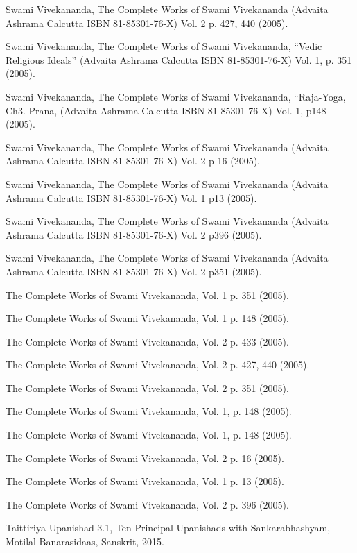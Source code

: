 \documentclass[twoside, 13pt]{article}
\begin{document}
{{{\begin{thebibliography}{99}
\bibitem{} Swami Vivekananda, The Complete Works of Swami Vivekananda (Advaita Ashrama Calcutta ISBN 81-85301-76-X) Vol. 2 p. 427, 440 (2005).

\bibitem{} Swami Vivekananda, The Complete Works of Swami Vivekananda, “Vedic Religious Ideals” (Advaita Ashrama Calcutta ISBN 81-85301-76-X) Vol. 1, p. 351 (2005).

\bibitem{} Swami Vivekananda, The Complete Works of Swami Vivekananda, “Raja-Yoga, Ch3. Prana, (Advaita Ashrama Calcutta ISBN 81-85301-76-X) Vol. 1, p148 (2005).

\bibitem{} Swami Vivekananda, The Complete Works of Swami Vivekananda (Advaita Ashrama Calcutta ISBN 81-85301-76-X) Vol. 2 p 16 (2005).

\bibitem{} Swami Vivekananda, The Complete Works of Swami Vivekananda (Advaita Ashrama Calcutta ISBN 81-85301-76-X) Vol. 1 p13 (2005).

\bibitem{} Swami Vivekananda, The Complete Works of Swami Vivekananda (Advaita Ashrama Calcutta ISBN 81-85301-76-X) Vol. 2 p396 (2005).

\bibitem{} Swami Vivekananda, The Complete Works of Swami Vivekananda (Advaita Ashrama Calcutta ISBN 81-85301-76-X) Vol. 2 p351 (2005).

\bibitem{} The Complete Works of Swami Vivekananda, Vol. 1 p. 351 (2005).

\bibitem{} The Complete Works of Swami Vivekananda, Vol. 1 p. 148 (2005).

\bibitem{} The Complete Works of Swami Vivekananda, Vol. 2 p. 433 (2005).

\bibitem{} The Complete Works of Swami Vivekananda, Vol. 2 p. 427, 440 (2005).

\bibitem{} The Complete Works of Swami Vivekananda, Vol. 2 p. 351 (2005).

\bibitem{} The Complete Works of Swami Vivekananda, Vol. 1, p. 148 (2005).

\bibitem{} The Complete Works of Swami Vivekananda, Vol. 1, p. 148 (2005).

\bibitem{} The Complete Works of Swami Vivekananda, Vol. 2 p. 16 (2005).

\bibitem{} The Complete Works of Swami Vivekananda, Vol. 1 p. 13 (2005).

\bibitem{} The Complete Works of Swami Vivekananda, Vol. 2 p. 396 (2005).

\bibitem{} Taittiriya Upanishad 3.1, Ten Principal Upanishads with Sankarabhashyam, Motilal Banarasidaas, Sanskrit, 2015. 


\end{thebibliography}}}}
\end{document}
